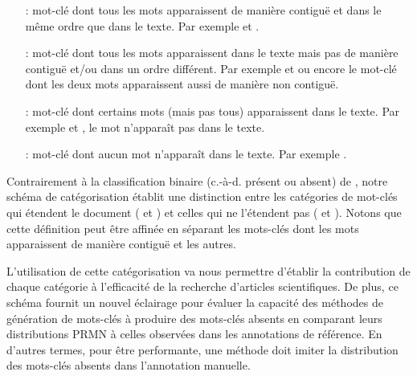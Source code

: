 \begin{itemize}[wide=0.5em,leftmargin=1em,itemsep=0.05em,font=\bfseries]
    \item[\present:] mot-clé dont tous les mots apparaissent de manière contiguë et dans le même ordre que dans le texte. Par exemple  et .
    
    \item[\reordonne:] mot-clé dont tous les mots apparaissent dans le texte mais pas de manière contiguë et/ou dans un ordre différent. Par exemple  et  ou encore le mot-clé  dont les deux mots apparaissent aussi de manière non contiguë.
    
    \item[\mixte:] mot-clé dont certains mots (mais pas tous) apparaissent dans le texte. Par exemple  et , le mot  n'apparaît pas dans le texte.
    
    \item[\nonvu:] mot-clé dont aucun mot n'apparaît dans le texte. Par exemple .
\end{itemize}

Contrairement à la classification binaire (c.-à-d. présent ou absent) de \citet{meng_deep_2017}, notre schéma de catégorisation établit une distinction entre les catégories de mot-clés qui étendent le document (\mixte{} et \nonvu) et celles qui ne l'étendent pas (\present{} et \reordonne).
Notons que cette définition peut être affinée en séparant les mots-clés \reordonnes{} dont les mots apparaissent de manière contiguë et les autres. %

L'utilisation de cette catégorisation va nous permettre d'établir la contribution de chaque catégorie à l'efficacité de la recherche d'articles scientifiques.
De plus, ce schéma fournit un nouvel éclairage pour évaluer la capacité des méthodes de génération de mots-clés à produire des mots-clés absents en comparant leurs distributions PRMN à celles observées dans les annotations de référence.
En d'autres termes, pour être performante, une méthode doit imiter la distribution des mots-clés absents dans l'annotation manuelle.


